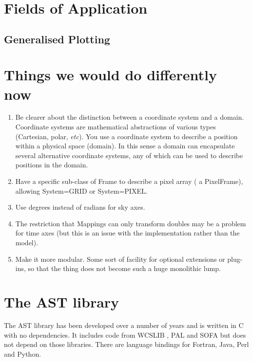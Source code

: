 \documentclass[final,authoryear,5p,times,twocolumn]{elsarticle}
\begin{document}
\section{Fields of Application}



\subsection{Generalised Plotting}

\section{Things we would do differently now}

\begin{enumerate}

\item Be clearer about the distinction between a coordinate system and
  a domain. Coordinate systems are mathematical abstractions of
  various types (Cartesian, polar, \emph{etc}). You use a coordinate system
  to describe a position within a physical space (domain). In this
  sense a domain can encapsulate several alternative coordinate
  systems, any of which can be used to describe positions in the
  domain.

\item Have a specific sub-class of Frame to describe a pixel array ( a
  PixelFrame), allowing System=GRID or System=PIXEL.

\item Use degrees instead of radians for sky axes.

\item The restriction that Mappings can only transform doubles may be
  a problem for time axes (but this is an issue with the
  implementation rather than the model).

\item Make it more modular. Some sort of facility for optional
  extensions or plug-ins, so that the thing does not become such a
  huge monolithic lump.

\end{enumerate}

\section{The AST library}

The AST library has been developed over a number of years
\citep{1998ASPC..145...41W,2000ASPC..216..506W,2001ASPC..238..129B,2004ASPC..314..412B,2008ASPC..394..635B,2010ASPC..434..213B,2012ASPC..461..825B}
  and is written in C with no dependencies. It includes code from
  WCSLIB \citep[][]{2006ASPC..351..591C}, PAL \citep{2013ASPC..475..307J}
  and SOFA \citep[][]{2011SchpJ...611404H} but does not depend on those
  libraries. There are language bindings for Fortran, Java, Perl and
  Python.
\end{document}
